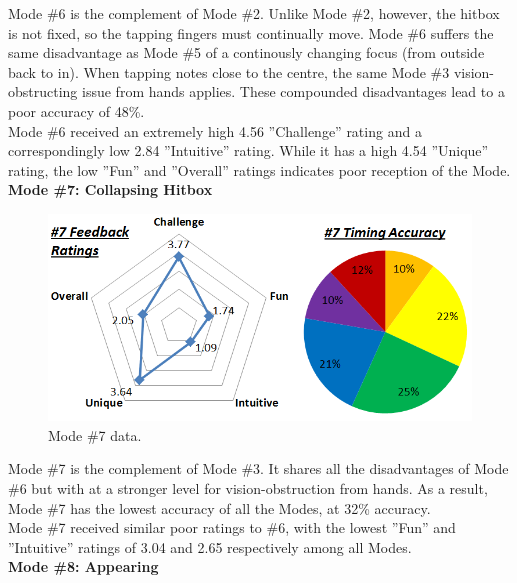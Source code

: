 \documentclass{sig-alternate}
\begin{document}
Mode \#6  is the complement of Mode \#2. Unlike Mode \#2, however, the hitbox is not fixed, so the tapping fingers must continually move. Mode \#6 suffers the same disadvantage as Mode \#5 of a continously changing focus (from outside back to in). When tapping notes close to the centre, the same Mode \#3 vision-obstructing issue from hands applies. These compounded disadvantages lead to a poor accuracy of 48\%. \\

Mode \#6 received an extremely high 4.56 ''Challenge'' rating and a correspondingly low 2.84 ''Intuitive'' rating. While it has a high 4.54 ''Unique'' rating, the low ''Fun'' and ''Overall'' ratings indicates poor reception of the Mode. \\

\noindent \textbf{Mode \#7: Collapsing Hitbox}

\begin{figure}[htb!]
	\begin{center}
		\includegraphics[width=1\linewidth]{figure_chart_7}
	\end{center}
	\vspace{-12pt}
	\caption{Mode \#7 data.}
	\label{fig:chart_7}
\end{figure}

Mode \#7 is the complement of Mode \#3. It shares all the disadvantages of Mode \#6 but with at a stronger level for vision-obstruction from hands. As a result, Mode \#7 has the lowest accuracy of all the Modes, at 32\% accuracy. \\

Mode \#7 received similar poor ratings to \#6, with the lowest ''Fun'' and ''Intuitive'' ratings of 3.04 and 2.65 respectively among all Modes. \\

\noindent \textbf{Mode \#8: Appearing}
\end{document}
